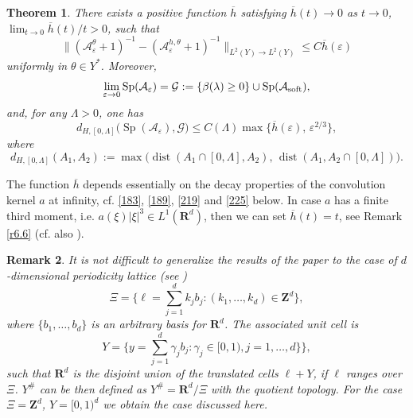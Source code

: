 \documentclass[11pt]{article}
\newcommand\e {\varepsilon}
\newcommand\soft{{\rm soft}}
\def\RR{\R}
\newcommand{\R}{\mathbf{R}}
\def\AA{\mathcal{A}}
\def\l{\lambda}
\DeclareMathOperator{\Sp}{Sp}
\newcommand\A{\mathcal A}
\newcommand\dist{\operatorname{dist}}
\newtheorem{theorem}{Theorem}[section]
\newtheorem{remark}[theorem]{Remark}
\theoremstyle{remark}
\begin{document}
\begin{theorem}  \label{th2.8}
	There exists a positive function $\overline{h}$ satisfying $\overline{h}(t) \to 0$ as $t\to 0$, $\lim_{t\to 0} \overline{h}(t)/t >0$, such that
	\begin{equation}\label{205a}
		\|  (\A_\e^\theta +1)^{-1} - (\AA_\e^{h,\theta}+1)^{-1}\|_{L^2(Y)\to L^2(Y)}\leq C  \overline{h}(\e)
	\end{equation}
	uniformly in $\theta\in Y^*$.
	Moreover,
	\begin{equation*}%
		\lim_{\e\to 0} \Sp (\AA_\e) = \mathcal G : = \{\beta(\l) \geq 0\}\cup \Sp(\AA_\soft),
	\end{equation*}
	and, for any $\Lambda >0$, one has
	\begin{equation*}%
		d_{H, [0, \Lambda]}\Big( \Sp (\AA_\e), \mathcal G \Big) \leq C(\Lambda) \max\{ \overline{h}(\e), \,\e^{2/3}\},
	\end{equation*}
	where
	\begin{equation*}
		d_{H, [0, \Lambda]}(A_1, A_2):= \max \big(   \dist(A_1  \cap [0, \Lambda], A_2), \,   \dist( A_1, A_2  \cap [0, \Lambda]) \big).
	\end{equation*}
\end{theorem}

The function $\overline{h}$ depends  essentially on the   decay properties of the convolution kernel $a$ at infinity, cf. \eqref{183}, \eqref{189}, \eqref{219} and \eqref{225} below. In case $a$ has a finite third moment, i.e. $a(\xi)|\xi|^3 \in L^1(\R^d)$, then we can set $\overline{h}(t) = t$, see Remark \ref{r6.6} (cf. also  {\cite[Theorem 5.6]{CKS2023}}).

%
\begin{remark}
	It is not difficult to generalize the results of the paper to the case of $d$-dimensional periodicity lattice (see \cite{mielketimofte})
	$$ \Xi= \{ \ell=\sum_{j=1}^d k_j b_j: (k_1,\dots,k_d)\in \mathbf{Z}^d  \}, $$where $\{b_1,\dots,b_d\}$ is an arbitrary basis for $\mathbf{R}^d$. The associated unit cell is
	$$ Y=\{y=\sum_{j=1}^d \gamma_j b_j: \gamma_j \in [0,1), j=1,\dots,d\}\}, $$
	such that $\RR^d$ is the disjoint union of the translated cells $\ell+Y$, if $\ell$ ranges over $\Xi$. $Y^{\#}$ can be then defined as $Y^{\#}=\RR^d/\Xi$ with the quotient topology.  For the case $\Xi=\mathbf{Z}^d$, $Y=[0,1)^d$ we obtain the case discussed here.
\end{remark}	
\end{document}
